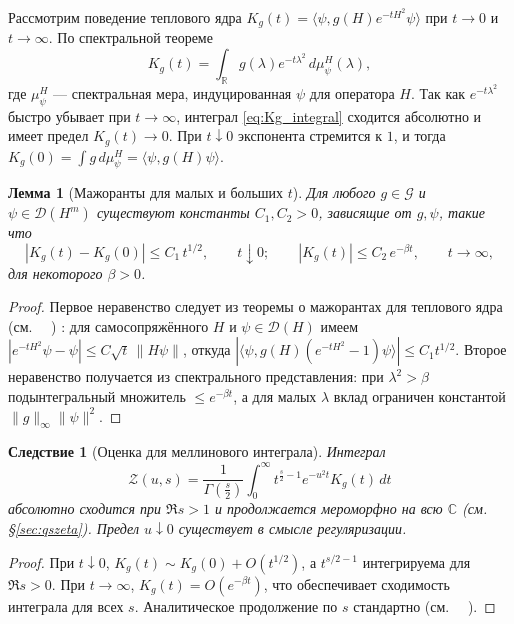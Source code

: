 \documentclass{article}
\numberwithin{equation}{section}
\theoremstyle{plain}
\newtheorem{lemma}{Лемма}
\newtheorem{corollary}{Следствие}
\theoremstyle{definition}
\theoremstyle{remark}
\def\infty{∞}\def\partial{∂}\def\sum{Σ}\def\int{∫}%
\begin{document}
Рассмотрим поведение теплового ядра $K_g(t)=\langle\psi,g(H)e^{-tH^2}\psi\rangle$
при $t\to 0$ и $t\to\infty$. По спектральной теореме
\begin{equation}
\label{eq:Kg_integral}
K_g(t)=\int_{\mathbb R} g(\lambda)e^{-t\lambda^2}\,d\mu_\psi^H(\lambda),
\end{equation}
где $\mu_\psi^H$ --- спектральная мера, индуцированная $\psi$ для оператора $H$.
Так как $e^{-t\lambda^2}$ быстро убывает при $t\to\infty$,
интеграл \eqref{eq:Kg_integral} сходится абсолютно и имеет предел $K_g(t)\to0$.
При $t\downarrow0$ экспонента стремится к $1$, и тогда $K_g(0)=\int g\,d\mu_\psi^H=\langle\psi,g(H)\psi\rangle$.

\begin{lemma}[Мажоранты для малых и больших $t$]
\label{lem:Kg_estimates}
Для любого $g\in\mathcal G$ и $\psi\in\mathcal D(H^m)$ существуют константы
$C_1,C_2>0$, зависящие от $g,\psi$, такие что
\begin{equation}
\label{eq:Kg_bounds_final}
|K_g(t)-K_g(0)|\le C_1\,t^{1/2},\qquad t\downarrow0;
\qquad
|K_g(t)|\le C_2\,e^{-\beta t},\qquad t\to\infty,
\end{equation}
для некоторого $\beta>0$.
\end{lemma}

\begin{proof}
Первое неравенство следует из теоремы о мажорантах для теплового ядра (см.~\cite{ReedSimonII} ~\cite{Davies1989}) :
для самосопряжённого $H$ и $\psi\in\mathcal D(H)$ имеем
$|e^{-tH^2}\psi-\psi|\le C\sqrt{t}\,\|H\psi\|$, откуда
$|\langle\psi,g(H)(e^{-tH^2}-1)\psi\rangle|\le C_1t^{1/2}$.
Второе неравенство получается из спектрального представления:
при $\lambda^2>\beta$ подынтегральный множитель $\le e^{-\beta t}$,
а для малых $\lambda$ вклад ограничен константой $\|g\|_\infty\|\psi\|^2$.
\end{proof}

\begin{corollary}[Оценка для меллинового интеграла]
\label{cor:mellin}
Интеграл
\begin{equation}
\label{eq:mellin_Z}
\mathcal Z(u,s)=\frac{1}{\Gamma(\tfrac s2)}\int_0^\infty t^{\frac s2-1}e^{-u^2t}K_g(t)\,dt
\end{equation}
абсолютно сходится при $\Re s>1$ и продолжается мероморфно на всю $\mathbb C$
(см. §\ref{sec:qszeta}). Предел $u\downarrow0$ существует в смысле регуляризации.
\end{corollary}

\begin{proof}
При $t\downarrow0$, $K_g(t)\sim K_g(0)+O(t^{1/2})$, а $t^{s/2-1}$ интегрируема для $\Re s>0$.
При $t\to\infty$, $K_g(t)=O(e^{-\beta t})$, что обеспечивает сходимость интеграла для всех $s$.
Аналитическое продолжение по $s$ стандартно (см.~\cite{Seeley1967} ~\cite{Minakshisundaram1949}).
\end{proof}
\end{document}
